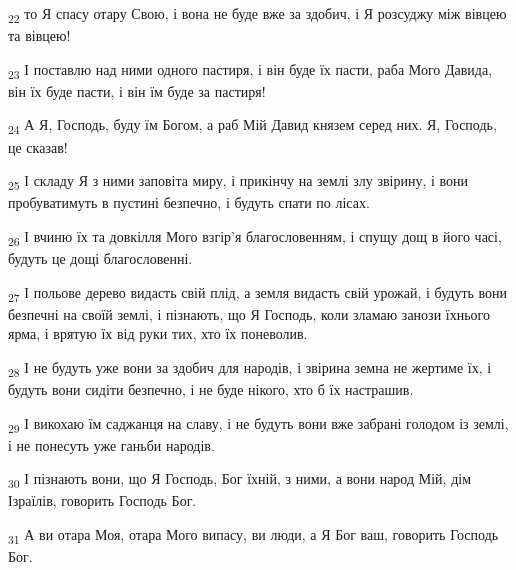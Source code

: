 \begin{tcolorbox}
\textsubscript{22} то Я спасу отару Свою, і вона не буде вже за здобич, і Я розсуджу між вівцею та вівцею!
\end{tcolorbox}
\begin{tcolorbox}
\textsubscript{23} І поставлю над ними одного пастиря, і він буде їх пасти, раба Мого Давида, він їх буде пасти, і він їм буде за пастиря!
\end{tcolorbox}
\begin{tcolorbox}
\textsubscript{24} А Я, Господь, буду їм Богом, а раб Мій Давид князем серед них. Я, Господь, це сказав!
\end{tcolorbox}
\begin{tcolorbox}
\textsubscript{25} І складу Я з ними заповіта миру, і прикінчу на землі злу звірину, і вони пробуватимуть в пустині безпечно, і будуть спати по лісах.
\end{tcolorbox}
\begin{tcolorbox}
\textsubscript{26} І вчиню їх та довкілля Мого взгір'я благословенням, і спущу дощ в його часі, будуть це дощі благословенні.
\end{tcolorbox}
\begin{tcolorbox}
\textsubscript{27} І польове дерево видасть свій плід, а земля видасть свій урожай, і будуть вони безпечні на своїй землі, і пізнають, що Я Господь, коли зламаю занози їхнього ярма, і врятую їх від руки тих, хто їх поневолив.
\end{tcolorbox}
\begin{tcolorbox}
\textsubscript{28} І не будуть уже вони за здобич для народів, і звірина земна не жертиме їх, і будуть вони сидіти безпечно, і не буде нікого, хто б їх настрашив.
\end{tcolorbox}
\begin{tcolorbox}
\textsubscript{29} І викохаю їм саджанця на славу, і не будуть вони вже забрані голодом із землі, і не понесуть уже ганьби народів.
\end{tcolorbox}
\begin{tcolorbox}
\textsubscript{30} І пізнають вони, що Я Господь, Бог їхній, з ними, а вони народ Мій, дім Ізраїлів, говорить Господь Бог.
\end{tcolorbox}
\begin{tcolorbox}
\textsubscript{31} А ви отара Моя, отара Мого випасу, ви люди, а Я Бог ваш, говорить Господь Бог.
\end{tcolorbox}
